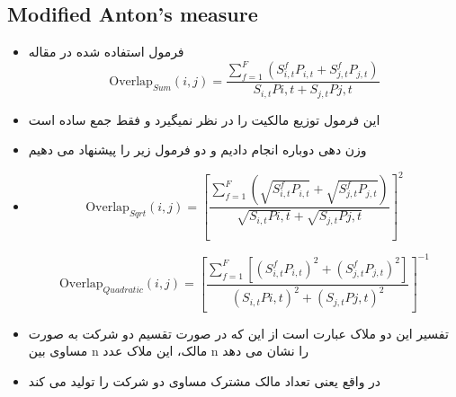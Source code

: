 
\begin{appendices}
	\section{Modified Anton's measure}
	\label{ModifiedMeasure}
	
	
	
	
	
	
	
	
	\begin{itemize}
		\item 
		فرمول استفاده شده در مقاله
		\begin{equation}
			\text{Overlap}_{Sum}(i, j) = \frac{\sum_{f = 1}^{F} (S^f_{i,t}P_{i,t}+S^f_{j,t}P_{j,t})}{S_{i,t}P{i,t} + S_{j,t}P{j,t}}
			\label{Sum}
		\end{equation}
		\item 
		این فرمول توزیع مالکیت را در نظر نمیگیرد و فقط جمع ساده است
		\item
		وزن دهی دوباره انجام دادیم و دو فرمول زیر را پیشنهاد می دهیم	
		\item
		
		\begin{equation}
			\text{Overlap}_{Sqrt}(i, j) =  [\frac{\sum_{f =1}^{F}(\sqrt{S^f_{i,t}P_{i,t}}+\sqrt{S^f_{j,t}P_{j,t}})}{\sqrt{S_{i,t}P{i,t}} + \sqrt{S_{j,t}P{j,t}}}]^2 
			\label{sqrt}
		\end{equation}
		
		\begin{equation}
			\text{Overlap}_{Quadratic}(i, j) =  [{\frac{\sum_{f = 1}^{F}[(S^f_{i,t}P_{i,t})^2+(S^f_{j,t}P_{j,t})^2]}{(S_{i,t}P{i,t})^2 + (S_{j,t}P{j,t})^2}}]^{-1}
			\label{Quadratic}
		\end{equation}
		\item
		تفسیر این دو ملاک عبارت است از این که در صورت تقسیم دو شرکت به صورت مساوی بین n مالک، این ملاک عدد n را نشان می دهد
		\item
		در واقع یعنی تعداد مالک مشترک مساوی دو شرکت را تولید می کند
	\end{itemize}
	

\end{appendices}
